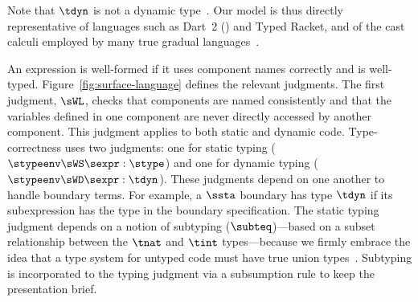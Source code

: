 Note that $\tdyn$ is not a dynamic type~\cite{t-popl-1990}.
Our model is thus directly representative of languages
 such as Dart~2 ({\small{}}) and Typed Racket,
 and of the cast calculi employed by many true gradual
 languages~\cite{svcb-snapl-2015,cs-popl-2017}.

An expression is well-formed if it uses component names correctly and
 is well-typed. Figure~\ref{fig:surface-language} defines the relevant
 judgments. The first judgment, $\sWL$, checks that components are
 named consistently and that the variables defined in one component are never
 directly accessed by another component.
This judgment applies to both static and
 dynamic code.
Type-correctness uses two judgments: one for static typing
 ($\stypeenv \sWS \sexpr : \stype$) and one for dynamic typing ($\stypeenv
 \sWD \sexpr : \tdyn$).
These judgments depend on one another to handle
 boundary terms.
For example, a $\ssta$ boundary has type $\tdyn$ if
 its subexpression has the type in the boundary specification.  The static typing
 judgment depends on a notion of subtyping ($\subteq$)---based on a subset
 relationship between the $\tnat$ and $\tint$ types---because we firmly
 embrace the idea that a type system for untyped code must
 have true union types~\cite{tf-icfp-2010,cl-icfp-2017,tfffgksst-snapl-2017}.
 Subtyping is incorporated to the typing
 judgment via a subsumption rule to keep the presentation brief.
